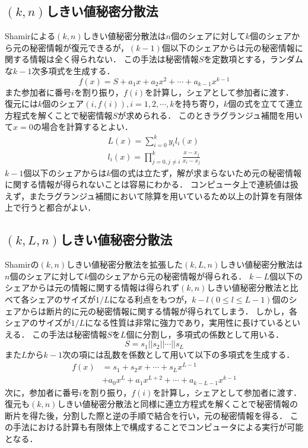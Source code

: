 \documentclass[twocolumn]{jarticle}
\begin{document}
\subsection{$(k,n)$しきい値秘密分散法\cite{shamir}}
Shamirによる$(k,n)$しきい値秘密分散法は$n$個のシェアに対して$k$個のシェアから元の秘密情報が復元できるが，$(k-1)$個以下のシェアからは元の秘密情報に関する情報は全く得られない．
%
この手法は秘密情報$S$を定数項とする，ランダムな$k-1$次多項式を生成する．
%
\begin{equation}
	f(x)=S+a_{1}x+a_{2}x^{2}+{\cdots}+a_{k-1}x^{k-1}
\end{equation}
%
また参加者に番号$i$を割り振り，$f(i)$を計算し，シェアとして参加者に渡す．
%
復元には$k$個のシェア$(i,f(i)),i=1,2,\cdots,k$を持ち寄り，$k$個の式を立てて連立方程式を解くことで秘密情報$S$が求められる．
%
このときラグランジュ補間を用いて$x=0$の場合を計算するとよい．
%
\begin{align}
	L(x)={\sum_{i=0}^{k}{y_{i}l_{i}(x)}} \\
	l_{i}(x)={\prod_{j=0,j{\neq}i}^{k}{\frac{x-x_{j}}{x_{i}-x_{j}}}}
\end{align}
%
$k-1$個以下のシェアからは$k$個の式は立たず，解が求まらないため元の秘密情報に関する情報が得られないことは容易にわかる．
%
コンピュータ上で連続値は扱えず，またラグランジュ補間において除算を用いているため以上の計算を有限体上で行うと都合がよい．

\subsection{$(k,L,n)$しきい値秘密分散法\cite{yamamoto}\cite{multiparty}}
Shamirの$(k,n)$しきい値秘密分散法を拡張した$(k,L,n)しきい値秘密分散法$は$n$個のシェアに対して$k$個のシェアから元の秘密情報が得られる．
%
$k-L$個以下のシェアからは元の情報に関する情報は得られず$(k,n)$しきい値秘密分散法と比べて各シェアのサイズが$1/L$になる利点をもつが，$k-l(0{\leq}l{\leq}L-1)$個のシェアからは断片的に元の秘密情報に関する情報が得られてしまう．
%
しかし，各シェアのサイズが$1/L$になる性質は非常に強力であり，実用性に長けているといえる．
%
この手法は秘密情報$S$を$L$個に分割し，多項式の係数として用いる．
%
\begin{equation}
	S=s_{1}||s_{2}||{\cdots}||s_{L}
\end{equation}
%
また$L$から$k-1$次の項には乱数を係数として用いて以下の多項式を生成する．
%
\begin{equation}
	\begin{split}
		f(x)&=s_{1}+s_{2}x+{\cdots}+s_{L}x^{L-1} \\
		&+a_{0}x^{L}+a_{1}x^{L+2}+{\cdots}+a_{k-L-1}x^{k-1}
	\end{split}
\end{equation}
%
次に，参加者に番号$i$を割り振り，$f(i)$を計算し，シェアとして参加者に渡す．
%
復元も$(k,n)$しきい値秘密分散法と同様に連立方程式を解くことで秘密情報の断片を得た後，分割した際と逆の手順で結合を行い，元の秘密情報を得る．
%
この手法における計算も有限体上で構成することでコンピュータによる実行が可能となる．
\end{document}
